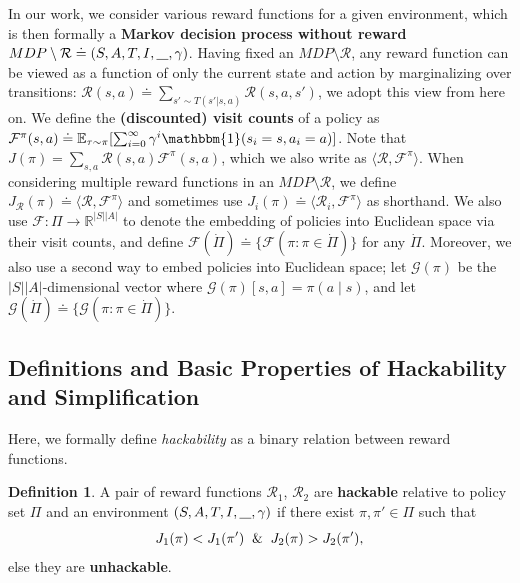 \documentclass{article}
\theoremstyle{definition}
\newtheorem{definition}{Definition}
\theoremstyle{remark}
\begin{document}
In our work, we consider various reward functions for a given environment, which is then formally a \textbf{Markov decision process without reward} $MDP \setminus \mathcal{R} \doteq (S,A,T,I,\underline{\hspace*{0.3cm}},\gamma)$.
Having fixed an $MDP \setminus \mathcal{R}$, any reward function can be viewed as a function of only the current state and action by marginalizing over transitions: $\mathcal{R}(s,a) \doteq \sum_{s' \sim T(s' | s,a)} \mathcal{R}(s,a,s')$, we adopt this view from here on.
We define the \textbf{(discounted) visit counts} of a policy as $\mathcal{F}^\pi(s,a) \doteq \mathbb{E}_{\tau \sim \pi}[\sum_{i=0}^\infty \gamma^i \mathbbm{1}(s_i=s, a_i=a)]$. %
Note that 
$J(\pi) = \sum_{s,a} \mathcal{R}(s,a) \mathcal{F}^\pi(s,a)$, which we also write as $\langle \mathcal{R}, \mathcal{F}^\pi\rangle$.
When considering multiple reward functions in an $MDP \setminus \mathcal{R}$, we define $J_\mathcal{R}(\pi) \doteq \langle \mathcal{R}, \mathcal{F}^\pi\rangle$ and sometimes use $J_i(\pi) \doteq \langle \mathcal{R}_i, \mathcal{F}^\pi \rangle$ as shorthand.
We also use $\mathcal{F}: \Pi \rightarrow \mathbb{R}^{|S||A|}$ to denote the embedding of policies into Euclidean space via their visit counts, and define $\mathcal{F}(\dot{\Pi}) \doteq \{\mathcal{F}(\pi: \pi \in \dot{\Pi})\}$ for any $\dot{\Pi}$.
Moreover, we also use a second way to embed policies into Euclidean space; let $\mathcal{G}(\pi)$ be the $|S||A|$-dimensional vector where $\mathcal{G}(\pi)[s,a] = \pi(a \mid s)$, and let $\mathcal{G}(\dot{\Pi}) \doteq \{\mathcal{G}(\pi: \pi \in \dot{\Pi})\}$.















\subsection{Definitions and Basic Properties of Hackability and Simplification} \label{sec:our_ definitions}

Here, we formally define \emph{hackability} as a binary relation between reward functions.


\begin{definition}\label{def:unhackable}
A pair of reward functions $\mathcal{R}_1$, $\mathcal{R}_2$ are \textbf{hackable} relative to policy set $\Pi$ and an environment $(S,A,T,I,\underline{\hspace*{0.3cm}},\gamma)$ if 
there exist $\pi,\pi' \in \Pi$ such that  
$$
J_1(\pi) < J_1(\pi') \And J_2(\pi) > J_2(\pi'),
$$
else they are \textbf{unhackable}. 
\end{definition}
\end{document}
